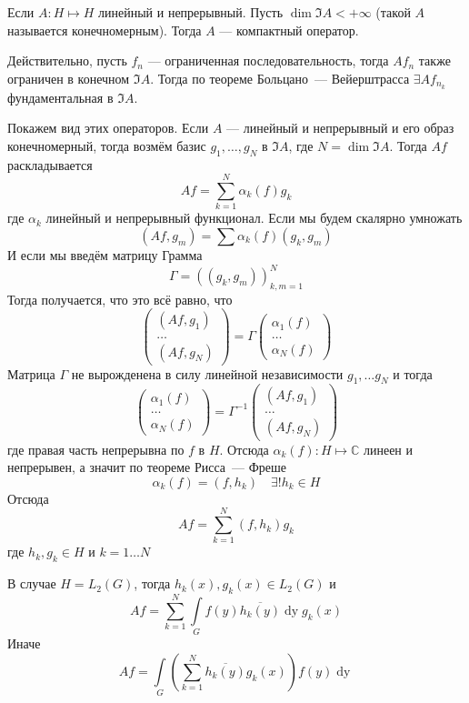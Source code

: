 \documentclass[14pt]{extarticle}
\begin{document}
\begin{Prim}
    Если $A : H \mapsto H$ линейный и непрерывный.
    Пусть $\dim \Im A < +\infty$ (такой $A$ называется конечномерным).
    Тогда $A$ --- компактный оператор.
    
    Действительно, пусть $f_n$ --- ограниченная последовательность, тогда
    $A f_n$ также ограничен в конечном $\Im A$.
    Тогда по теореме Больцано~--- Вейерштрасса $\exists A f_{n_k}$ фундаментальная
    в $\Im A$.
    
    Покажем вид этих операторов.
    Если $A$ --- линейный и непрерывный и его образ конечномерный, тогда
    возмём базис $g_1, \dots, g_N$ в $\Im A$, где $N = \dim \Im A$.
    Тогда $Af$ раскладывается
    $$
    Af = \sum\limits_{k = 1}^N\alpha_k(f)g_k
    $$
    где $\alpha_k$ линейный и непрерывный функционал.
    Если мы будем скалярно умножать
    $$
    (Af, g_m) = \sum \alpha_k(f) (g_k, g_m)
    $$
    И если мы введём матрицу Грамма
    $$
    \Gamma = ((g_k, g_m))_{k,m=1}^N
    $$
    Тогда получается, что это всё равно, что
    $$
    \left(
        \begin{array}{c}
            (Af, g_1)\\
            \dots\\
            (Af, g_N)
        \end{array}
    \right)
    =
    \Gamma \left(
        \begin{array}{c}
            \alpha_1(f)\\
            \dots\\
            \alpha_N(f)
        \end{array}
        \right)
    $$
    Матрица $\Gamma$ не вырожденена в силу линейной независимости 
    $g_1, \dots g_N$ и тогда
    $$
    \left(
        \begin{array}{c}
            \alpha_1(f)\\
            \dots\\
            \alpha_N(f)
        \end{array}
    \right)
    =
    \Gamma^{-1}\left(
        \begin{array}{c}
            (Af, g_1)\\
            \dots\\
            (Af, g_N)
        \end{array}
    \right)
    $$
    где правая часть непрерывна по $f$ в $H$.
    Отсюда $\alpha_k(f) : H \mapsto \mathbb C$ линеен и непрерывен, а значит
    по теореме Рисса~--- Фреше
    $$
    \alpha_k(f) = (f, h_k)\quad \exists! h_k \in H
    $$
    Отсюда
    $$
    Af = \sum\limits_{k = 1}^N(f, h_k)g_k
    $$
    где $h_k, g_k \in H$ и $k = 1 \dots N$
\end{Prim}
\begin{Prim}
    В случае $H = L_2(G)$, тогда $h_k(x), g_k(x) \in L_2(G)$ и
    $$
    Af = \sum\limits_{k = 1}^N \int\limits_G f(y)\overline{h_k(y)} \mathop{dy} 
    g_k(x) 
    $$
    Иначе
    $$
    Af = \int\limits_G \left(\sum\limits_{k = 1}^N \overline{h_k(y)} g_k(x)
    \right) f(y)\mathop{dy}
    $$
\end{Prim}
\end{document}
